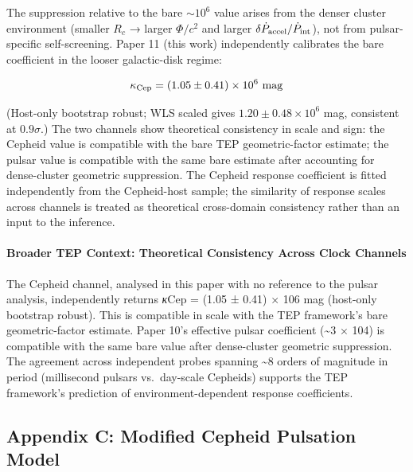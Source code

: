 \documentclass[
]{article}
\begin{document}
The suppression relative to the bare \(\sim10^6\) value arises from the
denser cluster environment (smaller \(R_c\) → larger \(\Phi/c^2\) and
larger \(\delta\dot{P}_{\rm accel}/\dot{P}_{\rm int}\)), not from
pulsar-specific self-screening. Paper 11 (this work) independently
calibrates the bare coefficient in the looser galactic-disk regime:

\begin{equation}
\kappa_{\rm Cep} = (1.05 \pm 0.41) \times 10^6\ {\rm mag}
\end{equation}

(Host-only bootstrap robust; WLS scaled gives
\(1.20 \pm 0.48 \times 10^6\) mag, consistent at \(0.9\sigma\).) The two
channels show theoretical consistency in scale and sign: the Cepheid
value is compatible with the bare TEP geometric-factor estimate; the
pulsar value is compatible with the same bare estimate after accounting
for dense-cluster geometric suppression. The Cepheid response
coefficient is fitted independently from the Cepheid-host sample; the
similarity of response scales across channels is treated as theoretical
cross-domain consistency rather than an input to the inference.

\begin{quote}
\end{quote}

\paragraph{Broader TEP Context: Theoretical Consistency Across Clock
Channels}\label{broader-tep-context-theoretical-consistency-across-clock-channels}

The Cepheid channel, analysed in this paper with no reference to the
pulsar analysis, independently returns \emph{κ}Cep = (1.05 ± 0.41) × 106
mag (host-only bootstrap robust). This is compatible in scale with the
TEP framework's bare geometric-factor estimate. Paper 10's effective
pulsar coefficient (\textasciitilde3 × 104) is compatible with the same
bare value after dense-cluster geometric suppression. The agreement
across independent probes spanning \textasciitilde8 orders of magnitude
in period (millisecond pulsars vs.~day-scale Cepheids) supports the TEP
framework's prediction of environment-dependent response coefficients.

\subsection{Appendix C: Modified Cepheid Pulsation
Model}\label{appendix-c-modified-cepheid-pulsation-model}
\end{document}

